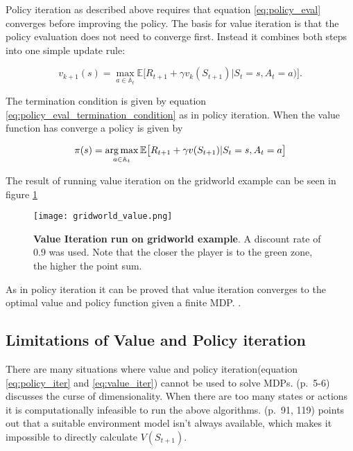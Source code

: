 Policy iteration as described above requires that equation \ref{eq:policy_eval} converges before improving the policy. The basis for value iteration is that the policy evaluation does not need to converge first. Instead it combines both steps into one simple update rule:

\begin{equation}
    v_{k+1}(s) = \max_{a \in \mathbb{A}_t} \mathbb{E}\big[R_{t+1} + \gamma v_{k}(S_{t+1})|S_t = s, A_t = a)\big].
    \label{eq:value_iter}
\end{equation}

The termination condition is given by equation \ref{eq:policy_eval_termination_condition} as in policy iteration. When the value function has converge a policy is given by

\begin{equation}
    \pi(s) = \operatorname*{arg\,max}_{a\in \mathbb{A}_t} \mathbb{E}\big[R_{t+1} + \gamma v(S_{t+1})|S_t=s, A_t=a\big]
\end{equation}

The result of running value iteration on the gridworld example can be seen in figure \ref{fig:value_it}

\begin{figure}[H]
\centering
\texttt{[image: gridworld\_value.png]}
\captionsetup{width=.7\linewidth}
\caption{\textbf{Value Iteration run on gridworld example}. A discount rate of $0.9$ was used. Note that the closer the player is to the green zone, the higher the point sum.}
\label{fig:value_it}
\end{figure}

As in policy iteration it can be proved that value iteration converges to the optimal value and policy function given a finite MDP. \citep[p.~89-93]{powell_2011}.

\subsection{Limitations of Value and Policy iteration}

There are many situations where value and policy iteration(equation \ref{eq:policy_iter} and \ref{eq:value_iter}) cannot be used to solve MDPs. \cite{powell_2011} (p.~5-6) discusses the curse of dimensionality. When there are too many states or actions it is computationally infeasible to run the above algorithms. \cite{sutton_barto_2018} (p.~91, 119) points out that a suitable environment model isn't always available, which makes it impossible to directly calculate $V(S_{t+1})$.

